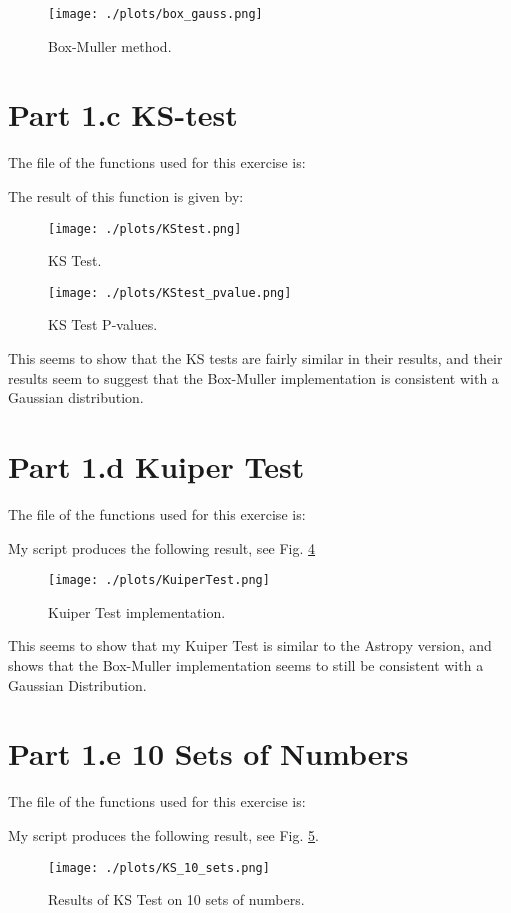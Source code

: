 \begin{figure}[h!]
  \centering
  \texttt{[image: ./plots/box\_gauss.png]}
  \caption{Box-Muller method.}
  \label{fig:boxmuller}
\end{figure}


\section{Part 1.c KS-test}

The file of the functions used for this exercise is:



The result of this function is given by:

\begin{figure}[h!]
  \centering
  \texttt{[image: ./plots/KStest.png]}
  \caption{KS Test.}
  \label{fig:kstest}
\end{figure}


\begin{figure}[h!]
  \centering
  \texttt{[image: ./plots/KStest\_pvalue.png]}
  \caption{KS Test P-values.}
  \label{fig:kstest}
\end{figure}

This seems to show that the KS tests are fairly similar in their results, and their results seem to
suggest that the Box-Muller implementation is consistent with a Gaussian distribution.


\section{Part 1.d Kuiper Test}

The file of the functions used for this exercise is:



My script produces the following result, see Fig. \ref{fig:kuiperTest}

\begin{figure}[h!]
  \centering
  \texttt{[image: ./plots/KuiperTest.png]}
  \caption{Kuiper Test implementation.}
  \label{fig:kuiperTest}
\end{figure}

This seems to show that my Kuiper Test is similar to the Astropy version, and shows that
the Box-Muller implementation seems to still be consistent with a Gaussian Distribution.


\section{Part 1.e 10 Sets of Numbers}

The file of the functions used for this exercise is:



My script produces the following result, see Fig. \ref{fig:10_sets}.

\begin{figure}[h!]
  \centering
  \texttt{[image: ./plots/KS\_10\_sets.png]}
  \caption{Results of KS Test on 10 sets of numbers. }
  \label{fig:10_sets}
\end{figure}


